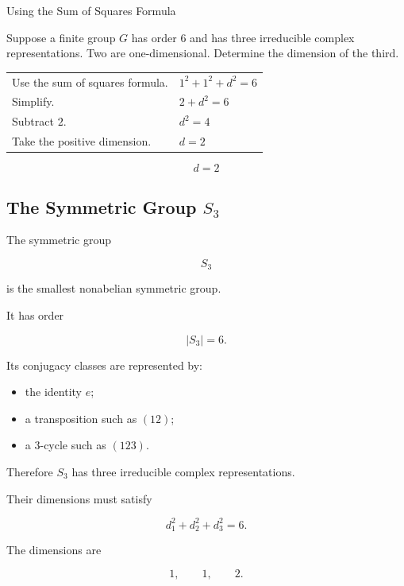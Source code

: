 \begin{workedexamplebox}{Using the Sum of Squares Formula}

Suppose a finite group \(G\) has order \(6\) and has three irreducible
complex representations. Two are one-dimensional. Determine the dimension
of the third.

\begin{tabularx}{\textwidth}{@{}>{\raggedright\arraybackslash}p{}X@{}}
Use the sum of squares formula. & \(1^2+1^2+d^2=6\)\\
Simplify. & \(2+d^2=6\)\\
Subtract \(2\). & \(d^2=4\)\\
Take the positive dimension. & \(d=2\)
\end{tabularx}

\begin{answerbox}
\[ \boxed{d=2} \]
\end{answerbox}
\end{workedexamplebox}

\subsection{The Symmetric Group \(S_3\)}
\label{subsec:s3-representations}

The symmetric group

\[ S_3 \]

is the smallest nonabelian symmetric group.

It has order

\[ |S_3|=6. \]

Its conjugacy classes are represented by:

\begin{itemize}
    \item the identity \(e\);
    \item a transposition such as \((12)\);
    \item a \(3\)-cycle such as \((123)\).
\end{itemize}

Therefore \(S_3\) has three irreducible complex representations.

Their dimensions must satisfy

\[ d_1^2+d_2^2+d_3^2=6. \]

The dimensions are

\[ 1,\qquad1,\qquad2. \]

